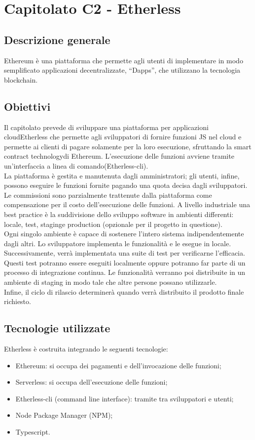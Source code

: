 \section{Capitolato C2 - Etherless}

\subsection{Descrizione generale}
Ethereum è una piattaforma che permette agli utenti di implementare in modo semplificato applicazioni decentralizzate, “Dapps”, che utilizzano la tecnologia blockchain\glo.

\subsection{Obiettivi}
Il capitolato prevede di sviluppare una piattaforma per applicazioni cloud\glo Etherless che permette agli sviluppatori di fornire funzioni JS nel cloud e permette ai clienti di pagare solamente per la loro esecuzione, sfruttando la smart contract technology\glo di Ethereum\glo.
L’esecuzione delle funzioni avviene tramite un’interfaccia a linea di comando\glo (Etherless-cli). \\
La piattaforma è gestita e manutenuta dagli amministratori; gli utenti, infine, possono eseguire le funzioni fornite pagando una quota decisa dagli sviluppatori. \\
Le commissioni sono parzialmente trattenute dalla piattaforma come compensazione per il costo dell’esecuzione delle funzioni. 
A livello industriale una best practice è la suddivisione dello sviluppo software in ambienti differenti: locale, test, staging\glo e production (opzionale per il progetto in questione). \\
Ogni singolo ambiente è capace di sostenere l’intero sistema indipendentemente dagli altri. Lo sviluppatore implementa le funzionalità e le esegue in locale. \\
Successivamente, verrà implementata una suite di test per verificarne l’efficacia\glo. Questi test potranno essere eseguiti localmente oppure potranno far parte di un processo di integrazione continua. Le funzionalità verranno poi distribuite in un ambiente di staging in modo tale che altre persone possano utilizzarle. \\
Infine, il ciclo di rilascio determinerà quando verrà distribuito il prodotto finale richiesto.


\subsection{Tecnologie utilizzate}
Etherless è costruita integrando le seguenti tecnologie:
\begin{itemize}
\item Ethereum: si occupa dei pagamenti e dell’invocazione delle funzioni;
\item Serverless: si occupa dell’esecuzione delle funzioni;
\item Etherless-cli (command line interface): tramite tra sviluppatori e utenti;
\item Node Package Manager (NPM\glo);
\item Typescript\glo.
\end{itemize}


